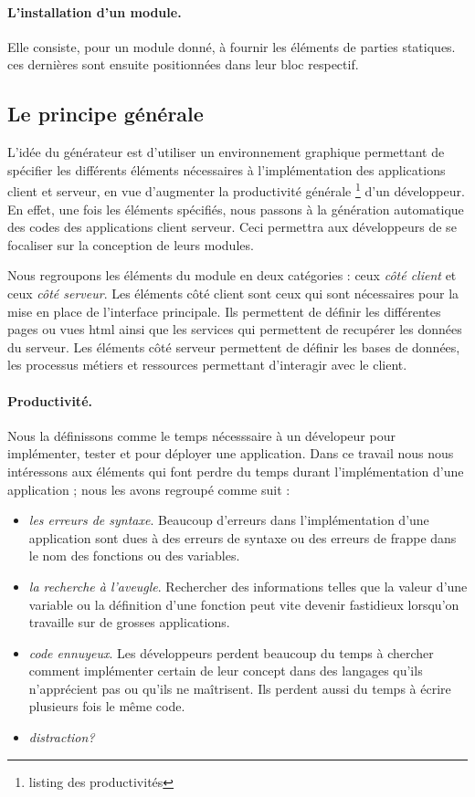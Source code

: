 \documentclass[a4paper,11pt]{report}
\begin{document}
\paragraph{L'installation d'un module.}
Elle consiste, pour un module donné, à  fournir les éléments de
parties statiques. ces dernières sont ensuite positionnées dans leur
bloc respectif.

\subsection{Le principe générale \label{par:product}}

L'idée du générateur est d'utiliser un environnement graphique
permettant de spécifier les différents éléments nécessaires à
l'implémentation des applications client et serveur, en vue d'augmenter
la productivité générale \footnote{listing des productivités} d'un développeur. En effet, une fois les
éléments spécifiés, nous passons à la génération automatique des codes
des applications client serveur. Ceci permettra aux développeurs de se
focaliser sur la conception de leurs modules.

Nous regroupons les éléments du module en deux catégories : ceux {\em
  côté client } et ceux {\em côté serveur}.
Les éléments côté client sont ceux qui sont nécessaires pour la mise
en place de l'interface principale. Ils permettent de définir les
différentes pages ou vues html ainsi que les services qui permettent
de recupérer les données du serveur.
Les éléments côté serveur permettent de définir les bases de données,
les processus métiers et ressources permettant d'interagir avec le
client.

\paragraph{Productivité. } Nous la définissons comme le temps nécesssaire à un
dévelopeur pour implémenter, tester et pour déployer une
application. Dans ce travail nous nous intéressons aux éléments qui
font perdre du temps durant l'implémentation d'une application ; nous
les avons regroupé comme suit :
\begin{itemize}
\item {\em les erreurs de syntaxe}. Beaucoup d'erreurs dans
  l'implémentation d'une application sont dues à des erreurs de syntaxe
  ou des erreurs de frappe dans le nom des fonctions ou des variables.
\item {\em la recherche à l'aveugle}. Rechercher des informations
  telles que la valeur d'une variable ou la définition d'une fonction
  peut vite devenir fastidieux lorsqu'on travaille sur de grosses
  applications.
\item {\em code ennuyeux}. Les développeurs perdent beaucoup du temps
  à chercher comment implémenter certain de leur concept dans des
  langages qu'ils n'apprécient pas ou qu'ils ne maîtrisent. Ils
  perdent aussi du temps à écrire plusieurs fois le même code.
\item {\em distraction?}
\end{itemize}
\end{document}
